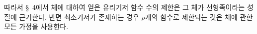 
따라서 \S\ 4에서 체에 대하여 얻은 유리기저 함수 수의 제한은 그 체가 선형족이라는 성질에 근거한다. 반면 최소기저가 존재하는 경우 $\rho$개의 함수로 제한되는 것은 체에 관한 모든 가정을 사용한다.
